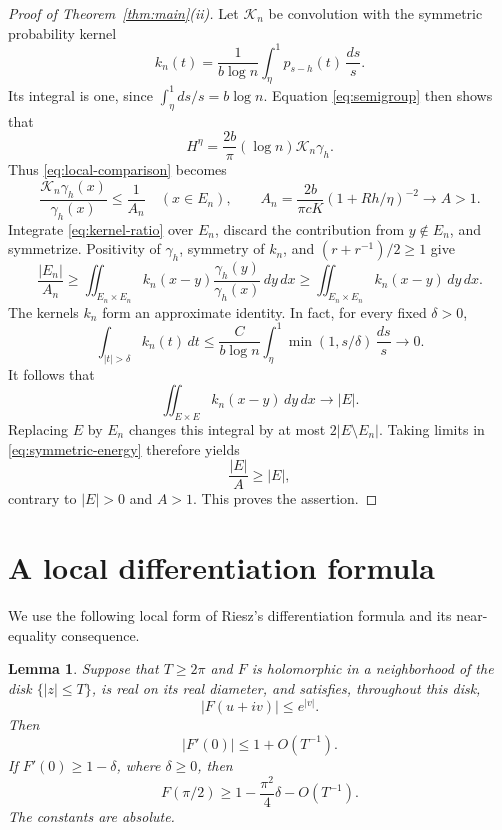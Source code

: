 \documentclass[11pt]{article}
\newtheorem{lemma}[theorem]{Lemma}
\theoremstyle{remark}
\numberwithin{equation}{section}
\begin{document}
\begin{proof}[Proof of Theorem~\ref{thm:main}(ii)]
Let \(\mathcal K_n\) be convolution with the symmetric probability kernel
\[
 k_n(t)=\frac1{b\log n}\int_\eta^1p_{s-h}(t)\,\frac{ds}{s}.
\]
Its integral is one, since \(\int_\eta^1 ds/s=b\log n\).
Equation \eqref{eq:semigroup} then shows that
\[
 H^\eta=\frac{2b}{\pi}(\log n)\mathcal K_n\gamma_h.
\]
Thus \eqref{eq:local-comparison} becomes
\begin{equation}\label{eq:kernel-ratio}
 \frac{\mathcal K_n\gamma_h(x)}{\gamma_h(x)}\le\frac1{A_n}
 \quad(x\in E_n),\qquad
 A_n=\frac{2b}{\pi cK}(1+Rh/\eta)^{-2}\longrightarrow A>1.
\end{equation}
Integrate \eqref{eq:kernel-ratio} over \(E_n\), discard the contribution from
\(y\notin E_n\), and symmetrize. Positivity of \(\gamma_h\), symmetry of
\(k_n\), and \((r+r^{-1})/2\ge1\) give
\begin{equation}\label{eq:symmetric-energy}
 \frac{|E_n|}{A_n}
 \ge\iint_{E_n\times E_n}k_n(x-y)
                  \frac{\gamma_h(y)}{\gamma_h(x)}\,dy\,dx
 \ge\iint_{E_n\times E_n}k_n(x-y)\,dy\,dx.
\end{equation}
The kernels \(k_n\) form an approximate identity. In fact, for every fixed
\(\delta>0\),
\[
 \int_{|t|>\delta}k_n(t)\,dt
 \le\frac{C}{b\log n}\int_\eta^1\min(1,s/\delta)\,\frac{ds}{s}
 \longrightarrow0.
\]
It follows that
\[
 \iint_{E\times E}k_n(x-y)\,dy\,dx\longrightarrow|E|.
\]
Replacing \(E\) by \(E_n\) changes this integral by at most \(2|E\setminus
E_n|\). Taking limits in \eqref{eq:symmetric-energy} therefore yields
\[
 \frac{|E|}{A}\ge|E|,
\]
contrary to \(|E|>0\) and \(A>1\). This proves the assertion.
\end{proof}



\section{A local differentiation formula}
\label{sec:local}


We use the following local form of Riesz's differentiation formula and its
near-equality consequence.

\begin{lemma}\label{lem:riesz}
Suppose that \(T\ge2\pi\) and \(F\) is holomorphic in a neighborhood of
the disk \(\{|z|\le T\}\), is real on its real diameter, and satisfies,
throughout this disk,
\[
 |F(u+iv)|\le e^{|v|}.
\]
Then
\begin{equation}\label{eq:riesz-derivative}
 |F'(0)|\le 1+O(T^{-1}).
\end{equation}
If \(F'(0)\ge 1-\delta\), where \(\delta\ge0\), then
\begin{equation}\label{eq:riesz-stability}
 F(\pi/2)\ge 1-\frac{\pi^2}{4}\delta-O(T^{-1}).
\end{equation}
The constants are absolute.

\end{lemma}
\end{document}
